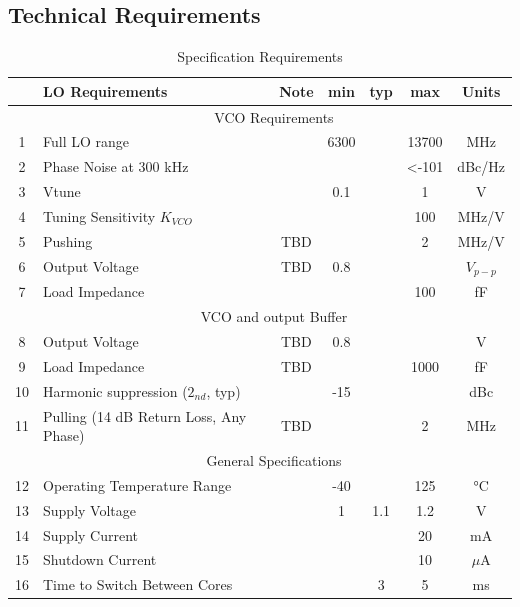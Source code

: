 \documentclass{article}
\begin{document}
\subsection{Technical Requirements}


\begin{table}[ht]
	\centering
	\begin{tabular}{|c|l|c|c|c|c|c|}
		\hline
		& LO Requirements & Note & min & typ & max & Units \\
		\hline
		& \multicolumn{6}{|c|}{VCO Requirements} \\
		\hline
		1 & Full LO range &  & 6300  &  & 13700 & MHz \\ 
		\hline
		2 & Phase Noise at 300 kHz &  &  &  & <-101 & dBc/Hz \\ 
		\hline
		3 & Vtune &  & 0.1 &  & 1 & V  \\ 
		\hline
		4 & Tuning Sensitivity $K_{VCO}$ &  &  &  & 100 & MHz/V  \\ 
		\hline
		5 & Pushing & TBD &  &  & 2 & MHz/V  \\ 
		\hline
		6 & Output Voltage & TBD & 0.8 &  & & $V_{p-p}$  \\ 
		\hline
		7 & Load Impedance &  &  &  & 100 & fF  \\ 
		\hline
		& \multicolumn{6}{|c|}{VCO and output Buffer} \\
		\hline
		8 & Output Voltage & TBD & 0.8  &  &  & V  \\ 
		\hline
		9 & Load Impedance & TBD &  &  & 1000 & fF  \\ 
		\hline
		10 & Harmonic suppression ($2_{nd}$, typ) &  & -15 &  &  & dBc  \\ 
		\hline
		11 & Pulling (14 dB Return Loss, Any Phase) & TBD &  &  & 2 & MHz  \\ 
		\hline
		& \multicolumn{6}{|c|}{General Specifications} \\
		\hline
		12 & Operating Temperature Range &  & -40 &  & 125 & °C  \\ 
		\hline
		13 & Supply Voltage &  & 1 & 1.1 & 1.2 & V  \\ 
		\hline
		14 & Supply Current &  &  &  & 20 & mA  \\ 
		\hline
		15 & Shutdown Current &  &  &  & 10 & $\mu$A  \\ 
		\hline
		16 & Time to Switch Between Cores  &  &  & 3 & 5 & ms  \\ 
		\hline
	\end{tabular}
	\label{table-spec}
	\caption{Specification Requirements} 

\end{table}
\end{document}
